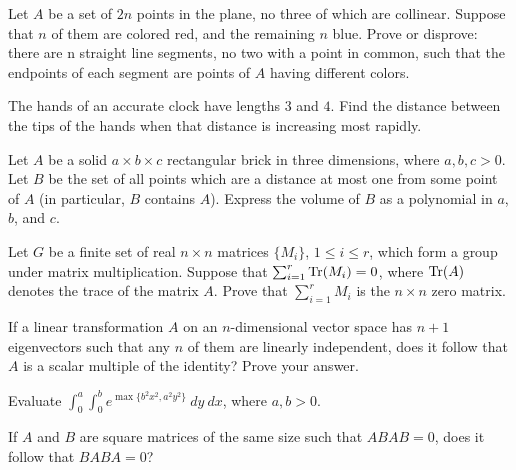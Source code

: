\documentclass[12pt]{article}
\begin{document}
    \begin{exercise}[1979 A4]
        Let $A$ be a set of $2n$ points in the plane, no three of which are collinear. Suppose that $n$ of them are colored red, and the remaining $n$ blue. Prove or disprove: there are n straight line segments, no two with a point in common, such that the endpoints of each segment are points of $A$ having different colors. 
    \end{exercise}

    \begin{exercise}[1983 A2]
        The hands of an accurate clock have lengths $3$ and $4$. Find the distance between the tips of the hands when that distance is increasing most rapidly.
    \end{exercise}

    \begin{exercise}[1984 A1]
        Let $A$ be a solid $a\times b\times c $ rectangular brick in three dimensions, where $a,b,c>0$. Let $B$ be the set of all points which are a distance at most one from some point of $A$ (in particular, $B$ contains $A$). Express the volume of $B$ as a polynomial in $a$, $b$, and $c$.
    \end{exercise}

    \begin{exercise}[1985 B6]
        Let $G$ be a finite set of real $n \times n$ matrices $\{M_i\}$, $1 \leqslant i \leqslant r$, which form a group under matrix multiplication. Suppose that $\sum_{i=1}^r \operatorname{Tr} (M_i) = 0$, where $\operatorname{Tr} (A)$ denotes the trace of the matrix $A$. Prove that $\sum_{i=1}^r M_i$ is the $n \times n$ zero matrix.
    \end{exercise}

    \begin{exercise}[1988 A6]
        If a linear transformation $A$ on an $n$-dimensional vector space has $n+1$ eigenvectors such that any $n$ of them are linearly independent, does it follow that $A$ is a scalar multiple of the identity? Prove your answer.  
    \end{exercise}

    \begin{exercise}[1989 A2]
        Evaluate $\int_0^a \int_0^b e^{\max\{b^2x^2,a^2y^2\}}\ dy\ dx$, where $a,b>0$.
    \end{exercise}

    \begin{exercise}[1990 A5]
        If $A$ and $B$ are square matrices of the same size such that $ABAB = 0$, does it follow that $BABA = 0$?
    \end{exercise}
\end{document}
